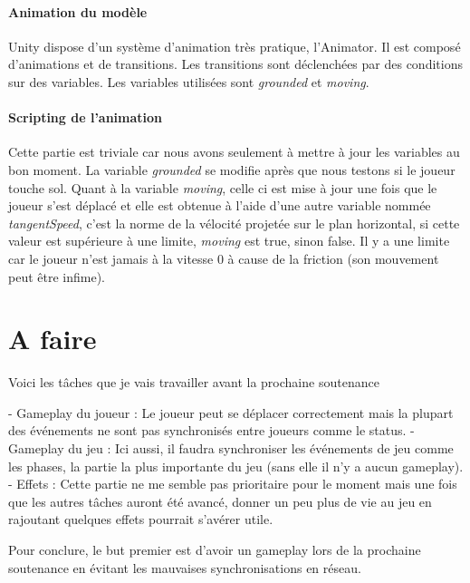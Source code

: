 \documentclass{article}
\begin{document}
\paragraph{Animation du modèle}

Unity dispose d'un système d'animation très pratique, l'Animator. Il est composé d'animations et de transitions. Les transitions sont déclenchées par des conditions sur des variables. Les variables utilisées sont \emph{grounded} et \emph{moving}.



\paragraph{Scripting de l'animation}

Cette partie est triviale car nous avons seulement à mettre à jour les variables au bon moment. La variable \emph{grounded} se modifie après que nous testons si le joueur touche sol. Quant à la variable \emph{moving}, celle ci est mise à jour une fois que le joueur s'est déplacé et elle est obtenue à l'aide d'une autre variable nommée \emph{tangentSpeed}, c'est la norme de la vélocité projetée sur le plan horizontal, si cette valeur est supérieure à une limite, \emph{moving} est true, sinon false. Il y a une limite car le joueur n'est jamais à la vitesse 0 à cause de la friction (son mouvement peut être infime).


\section{A faire}

Voici les tâches que je vais travailler avant la prochaine soutenance


- Gameplay du joueur : Le joueur peut se déplacer correctement mais la plupart des événements ne sont pas synchronisés entre joueurs comme le status.
- Gameplay du jeu : Ici aussi, il faudra synchroniser les événements de jeu comme les phases, la partie la plus importante du jeu (sans elle il n'y a aucun gameplay).
- Effets : Cette partie ne me semble pas prioritaire pour le moment mais une fois que les autres tâches auront été avancé, donner un peu plus de vie au jeu en rajoutant quelques effets pourrait s'avérer utile.

Pour conclure, le but premier est d'avoir un gameplay lors de la prochaine soutenance en évitant les mauvaises synchronisations en réseau.


 

\newpage
\end{document}
